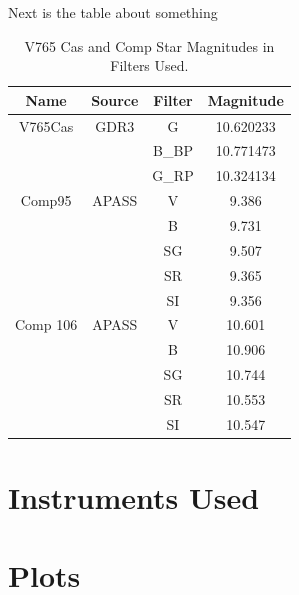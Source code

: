 \documentclass[linenumbers]{aastex631}
\begin{document}
Next is the table about something

\begin{table}[H] 
\caption{V765 Cas and Comp Star Magnitudes in Filters Used. \label{tabmagsinfo}}
\centering
\begin{tabular}{ | c | c | c | c | }
    \hline
    Name &
        Source &
        Filter &
        Magnitude \\
    \hline
    \hline
    V765Cas  &
        GDR3 & G & 10.620233\\ \cline{3-4}
        { }  & { } & B\_BP & 10.771473 \\ \cline{3-4}
        { }  & { } & G\_RP & 10.324134 \\
    \hline
    Comp95  &
        APASS &
        V & 9.386 \\ \cline{3-4}
        { }  & { } & B & 9.731 \\ \cline{3-4}
        { }  & { } & SG & 9.507 \\ \cline{3-4}
        { }  & { } & SR & 9.365 \\ \cline{3-4}
        { }  & { } & SI & 9.356 \\
    \hline
    Comp 106 &
        APASS &
        V & 10.601 \\ \cline{3-4}
        { }  & { } & B & 10.906 \\ \cline{3-4}
        { }  & { } & SG & 10.744 \\ \cline{3-4}
        { }  & { } & SR & 10.553 \\ \cline{3-4}
        { }  & { } & SI & 10.547 \\
    \hline
\end{tabular}
\end{table}


\section{Instruments Used}
\label{sec:instr}

\section{Plots}
\label{sec:plots}
\end{document}
